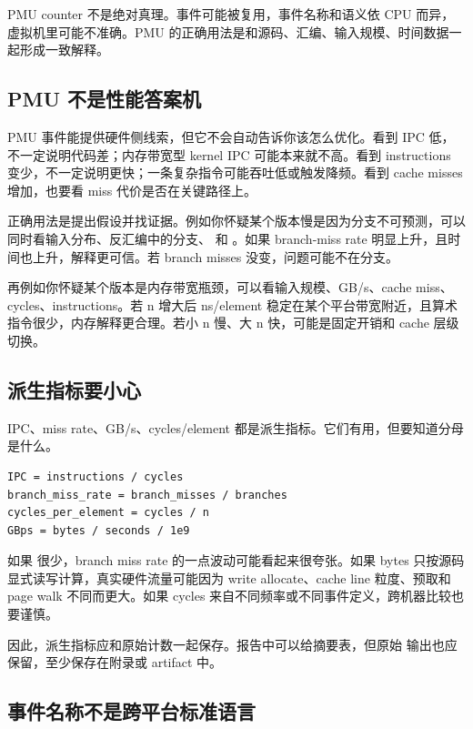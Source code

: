 \begin{warningbox}
PMU counter 不是绝对真理。事件可能被复用，事件名称和语义依 CPU 而异，虚拟机里可能不准确。PMU 的正确用法是和源码、汇编、输入规模、时间数据一起形成一致解释。
\end{warningbox}

\subsection{PMU 不是性能答案机}

PMU 事件能提供硬件侧线索，但它不会自动告诉你该怎么优化。看到 IPC 低，不一定说明代码差；内存带宽型 kernel IPC 可能本来就不高。看到 instructions 变少，不一定说明更快；一条复杂指令可能吞吐低或触发降频。看到 cache misses 增加，也要看 miss 代价是否在关键路径上。

正确用法是提出假设并找证据。例如你怀疑某个版本慢是因为分支不可预测，可以同时看输入分布、反汇编中的分支、 和 。如果 branch-miss rate 明显上升，且时间也上升，解释更可信。若 branch misses 没变，问题可能不在分支。

再例如你怀疑某个版本是内存带宽瓶颈，可以看输入规模、GB/s、cache miss、cycles、instructions。若 n 增大后 ns/element 稳定在某个平台带宽附近，且算术指令很少，内存解释更合理。若小 n 慢、大 n 快，可能是固定开销和 cache 层级切换。

\subsection{派生指标要小心}

IPC、miss rate、GB/s、cycles/element 都是派生指标。它们有用，但要知道分母是什么。

\begin{lstlisting}
IPC = instructions / cycles
branch_miss_rate = branch_misses / branches
cycles_per_element = cycles / n
GBps = bytes / seconds / 1e9
\end{lstlisting}

如果  很少，branch miss rate 的一点波动可能看起来很夸张。如果 bytes 只按源码显式读写计算，真实硬件流量可能因为 write allocate、cache line 粒度、预取和 page walk 不同而更大。如果 cycles 来自不同频率或不同事件定义，跨机器比较也要谨慎。

因此，派生指标应和原始计数一起保存。报告中可以给摘要表，但原始  输出也应保留，至少保存在附录或 artifact 中。

\subsection{事件名称不是跨平台标准语言}

